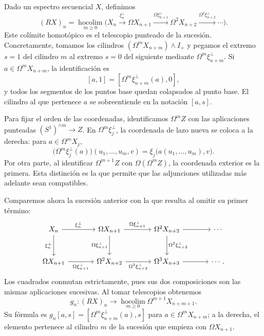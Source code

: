 Dado un espectro secuencial $X$, definimos
\[
(RX)_n=\operatorname*{hocolim}_{m\ge0}
\bigl(X_n\xrightarrow{\xi_n^{\perp}}\Omega X_{n+1}
\xrightarrow{\Omega\xi_{n+1}^{\perp}}\Omega^2X_{n+2}
\xrightarrow{\Omega^2\xi_{n+2}^{\perp}}\cdots\bigr).
\]
Este colímite homotópico es el telescopio punteado de la sucesión. Concretamente, tomamos los cilindros $(\Omega^mX_{n+m})\wedge I_+$ y pegamos el extremo $s=1$ del cilindro $m$ al extremo $s=0$ del siguiente mediante $\Omega^m\xi_{n+m}^{\perp}$. Si $a\in\Omega^mX_{n+m}$, la identificación es
\[
[a,1]=[\Omega^m\xi_{n+m}^{\perp}(a),0],
\]
y todos los segmentos de los puntos base quedan colapsados al punto base. El cilindro al que pertenece $a$ se sobreentiende en la notación $[a,s]$.

\begin{center}

\end{center}

Para fijar el orden de las coordenadas, identificamos $\Omega^m Z$ con las aplicaciones punteadas $(S^1)^{\wedge m}\to Z$. En $\Omega^m\xi_j^{\perp}$, la coordenada de lazo nueva se coloca a la derecha: para $a\in\Omega^mX_j$,
\[
\bigl(\Omega^m\xi_j^{\perp}(a)\bigr)(u_1,\ldots,u_m,v)
=\xi_j\bigl(a(u_1,\ldots,u_m),v\bigr).
\]
Por otra parte, al identificar $\Omega^{m+1}Z$ con $\Omega(\Omega^mZ)$, la coordenada exterior es la primera. Esta distinción es la que permite que las adjunciones utilizadas más adelante sean compatibles.

Comparemos ahora la sucesión anterior con la que resulta al omitir su primer término:
\[
\begin{tikzcd}[column sep=large,row sep=large]
X_n \arrow[r,"\xi_n^{\perp}"] \arrow[d,"\xi_n^{\perp}"']
& \Omega X_{n+1} \arrow[r,"\Omega\xi_{n+1}^{\perp}"] \arrow[d,"\Omega\xi_{n+1}^{\perp}"']
& \Omega^2X_{n+2} \arrow[r] \arrow[d,"\Omega^2\xi_{n+2}^{\perp}"] & \cdots\\
\Omega X_{n+1} \arrow[r,"\Omega\xi_{n+1}^{\perp}"']
& \Omega^2X_{n+2} \arrow[r,"\Omega^2\xi_{n+2}^{\perp}"']
& \Omega^3X_{n+3} \arrow[r] & \cdots.
\end{tikzcd}
\]
Los cuadrados conmutan estrictamente, pues sus dos composiciones son las mismas aplicaciones sucesivas. Al tomar telescopios obtenemos
\[
g_n\colon(RX)_n\longrightarrow
\operatorname*{hocolim}_{m\ge0}\Omega^{m+1}X_{n+m+1}.
\]
Su fórmula es $g_n[a,s]=[\Omega^m\xi_{n+m}^{\perp}(a),s]$ para $a\in\Omega^mX_{n+m}$; a la derecha, el elemento pertenece al cilindro $m$ de la sucesión que empieza con $\Omega X_{n+1}$.

